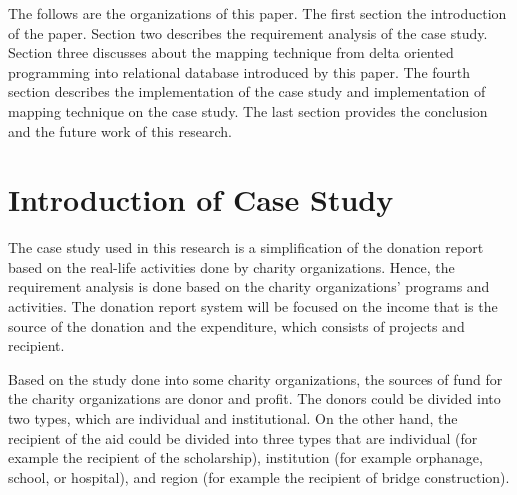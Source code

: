 \documentclass[runningheads,a4paper]{llncs}
\begin{document}
The follows are the organizations of this paper. 
The first section the introduction of the paper. 
Section two describes the requirement analysis of the case study. 
Section three discusses about the mapping technique from delta oriented programming into relational database introduced by this paper. 
The fourth section describes the implementation of the case study and implementation of mapping technique on the case study. 
The last section provides the conclusion and the future work of this research.


\section{Introduction of Case Study}

The case study used in this research is a simplification of the donation report based on the real-life activities done by charity organizations. Hence, the requirement analysis is done based on the charity organizations’ programs and activities. The donation report system will be focused on the income that is the source of the donation and the expenditure, which consists of projects and recipient.

Based on the study done into some charity organizations, the sources of fund for the charity organizations are donor and profit. The donors could be divided into two types, which are individual and institutional. On the other hand, the recipient of the aid could be divided into three types that are individual (for example the recipient of the scholarship), institution (for example orphanage, school, or hospital), and region (for example the recipient of bridge construction).
\end{document}
